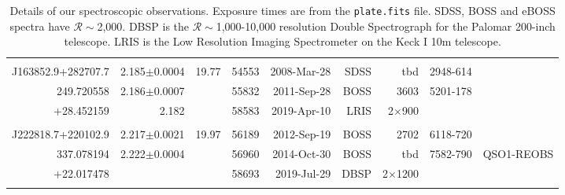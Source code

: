 \documentclass[a4paper,fleqn,usenatbib]{mnras}
\begin{document}
\begin{table}
\begin{tabular}{r  r  r r r   r r r r}
                                   &                                        &                          &              &                          &                   &                                &                              & \\
    J163852.9+282707.7   & 2.185$\pm$0.0004       &   19.77               & 54553 & 2008-Mar-28     & SDSS             & tbd                          &  2948-614              & \\
    249.720558	             &  2.186$\pm$0.0007      &                           & 55832  & 2011-Sep-28     & BOSS            &   3603                  &  5201-178            & \\
    +28.452159             &  2.182                           &                           & 58583 & 2019-Apr-10      & LRIS              &  2$\times$900    &                              & \\
                                   &                                      &                          &              &                           &                   &                              &                                & \\
    J222818.7+220102.9   & 2.217$\pm$0.0021      & 19.97                 & 56189 & 2012-Sep-19      & BOSS             &  2702                 &   6118-720          & \\
    337.078194             & 2.222$\pm$0.0004      &                          & 56960 & 2014-Oct-30      & BOSS             & tbd                         &   7582-790          & QSO1-REOBS \\ 
    +22.017478            &                                      &                          & 58693 & 2019-Jul-29        & DBSP              & 2$\times$1200  &                           &    \\
                                   &                                     &                           &            &                             &                   &                              &                            & \\
    \hline \hline   
  \end{tabular}
  \caption{
    Details of our spectroscopic observations. 
    Exposure times are from the {\tt plate.fits} file.  SDSS, BOSS and
    eBOSS spectra have $\mathcal{R}\sim$2,000.  DBSP is the
    $\mathcal{R}\sim$1,000-10,000 resolution Double Spectrograph for the
    Palomar 200-inch telescope.  LRIS is the Low Resolution Imaging
    Spectrometer on the Keck I 10m telescope.} 
  \label{tab:obs_notes}
\end{table}
\end{document}
